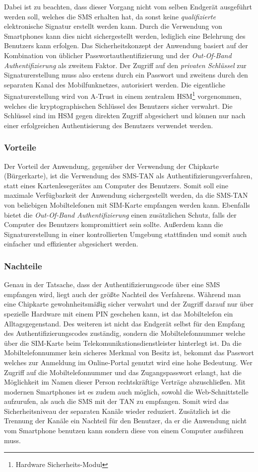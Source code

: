 \documentclass[11pt,a4paper,ngerman]{scrreprt}
\begin{document}
Dabei ist zu beachten, dass dieser Vorgang nicht vom selben Endgerät ausgeführt werden soll, welches die SMS erhalten hat, da sonst keine \emph{qualifizierte} elektronische Signatur erstellt werden kann. Durch die Verwendung von Smartphones kann dies nicht sichergestellt werden, lediglich eine Belehrung des Benutzers kann erfolgen. Das Sicherheitskonzept der Anwendung basiert auf der Kombination von üblicher Passwortauthentifizierung und der \emph{Out-Of-Band Authentifizierung} als zweitem Faktor. Der Zugriff auf den \emph{privaten Schlüssel} zur Signaturerstellung muss also erstens durch ein Passwort und zweitens durch den separaten Kanal des Mobilfunknetzes, autorisiert werden. Die eigentliche Signaturerstellung wird von A-Trust in einem zentralem HSM\footnote{Hardware Sicherheits-Modul} vorgenommen, welches die kryptographischen Schlüssel des Benutzers sicher verwahrt. Die Schlüssel sind im HSM gegen direkten Zugriff abgesichert und können nur nach einer erfolgreichen Authentisierung des Benutzers verwendet werden.
\subsubsection{Vorteile}
Der Vorteil der Anwendung, gegenüber der Verwendung der Chipkarte (Bürgerkarte), ist die Verwendung des SMS-TAN als Authentifizierungsverfahren, statt eines Kartenlesegerätes am Computer des Benutzers. Somit soll eine maximale Verfügbarkeit der Anwendung sichergestellt werden, da die SMS-TAN von beliebigen Mobiltelefonen mit SIM-Karte empfangen werden kann. Ebenfalls bietet die \emph{Out-Of-Band Authentifizierung} einen zusätzlichen Schutz, falls der Computer des Benutzers kompromittiert sein sollte. Außerdem kann die Signaturerstellung in einer kontrollierten Umgebung stattfinden und somit auch einfacher und effizienter abgesichert werden.
\subsubsection{Nachteile}
Genau in der Tatsache, dass der Authentifizierungscode über eine SMS empfangen wird, liegt auch der größte Nachteil des Verfahrens. Während man eine Chipkarte gewohnheitsmäßig sicher verwahrt und der Zugriff darauf nur über spezielle Hardware mit einem PIN geschehen kann, ist das Mobiltelefon ein Alltagsgegenstand. Des weiteren ist nicht das Endgerät selbst für den Empfang des Authentifizierungscodes zuständig, sondern die Mobiltelefonnummer welche über die SIM-Karte beim Telekomunikationsdienstleister hinterlegt ist. Da die Mobiltelefonnummer kein sicheres Merkmal von Besitz ist, bekommt das Passwort welches zur Anmeldung im Online-Portal genutzt wird eine hohe Bedeutung. Wer Zugriff auf die Mobiltelefonnummer und das Zugangspasswort erlangt, hat die Möglichkeit im Namen dieser Person rechtskräftige Verträge abzuschließen. Mit modernen Smartphones ist es zudem auch möglich, sowohl die Web-Schnittstelle aufzurufen, als auch die SMS mit der TAN zu empfangen. Somit wird das Sicherheitsniveau der separaten Kanäle wieder reduziert. Zusätzlich ist die Trennung der Kanäle ein Nachteil für den Benutzer, da er die Anwendung nicht vom Smartphone benutzen kann sondern diese von einem Computer ausführen muss.
\end{document}

